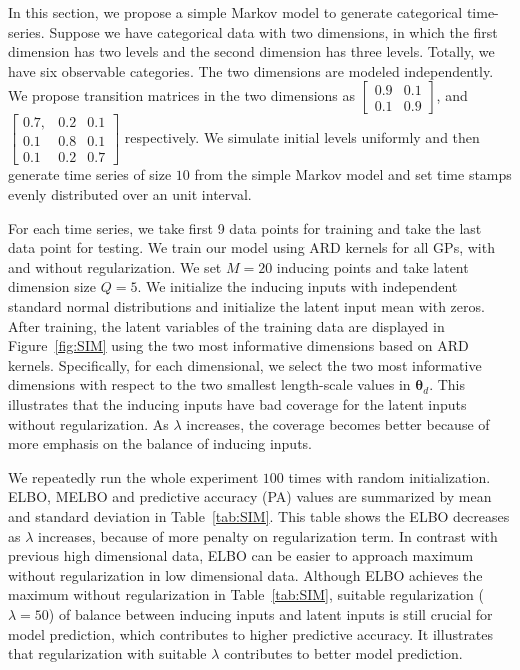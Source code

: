\documentclass{article}
\begin{document}
In this section, we propose a simple Markov model to generate categorical time-series. Suppose we have categorical data with two dimensions, in which the first dimension has two levels and the second dimension has three levels. Totally, we have six observable categories. The two dimensions are modeled independently. We propose transition matrices in the two dimensions as $\begin{bmatrix}
0.9 & 0.1\\
0.1 & 0.9
\end{bmatrix}$, 
and$ \begin{bmatrix}
0.7, & 0.2 & 0.1 \\
0.1 & 0.8 & 0.1\\
0.1 & 0.2 & 0.7
\end{bmatrix}$ respectively. We simulate initial levels uniformly and then generate time series of size $10$ from the simple Markov model and set time stamps evenly distributed over an unit interval. 

For each time series, we take first 9 data points for training and 
take the last data point for testing. We train our model using ARD kernels for all GPs, with and without regularization. We set $M = 20$ inducing points and take latent dimension size $Q = 5$. We initialize the inducing inputs with independent standard normal distributions and initialize the latent input mean with zeros. After training, the latent variables of the training data are displayed in Figure~\ref{fig:SIM} using the two most informative dimensions based on ARD kernels. Specifically, for each dimensional, we select the two most informative dimensions with respect to the two smallest length-scale values in $\bm\theta_d$. This illustrates that the inducing inputs have bad coverage for the latent inputs without regularization. As $\lambda$ increases, the coverage becomes better because of more emphasis on the balance of inducing inputs. 

We repeatedly run the whole experiment $100$ times with random initialization. ELBO, MELBO and predictive accuracy (PA) values are summarized by mean and standard deviation in Table~\ref{tab:SIM}. This table shows the ELBO decreases as $\lambda$ increases, because of more penalty on regularization term. In contrast with previous high dimensional data, ELBO can be easier to approach maximum without regularization in low dimensional data. Although ELBO achieves the maximum without regularization in Table~\ref{tab:SIM}, suitable regularization ($\lambda = 50$) of balance between inducing inputs and latent inputs is still crucial for model prediction, which contributes to higher predictive accuracy. It illustrates that regularization with suitable $\lambda$ contributes to better model prediction. 
\end{document}
